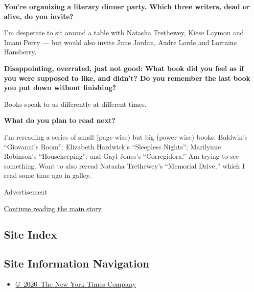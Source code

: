 \textbf{You're organizing a literary dinner party. Which three writers,
dead or alive, do you invite?}

I'm desperate to sit around a table with Natasha Trethewey, Kiese Laymon
and Imani Perry --- but would also invite June Jordan, Audre Lorde and
Lorraine Hansberry.

\textbf{Disappointing, overrated, just not good: What book did you feel
as if you were supposed to like, and didn't? Do you remember the last
book you put down without finishing?}

Books speak to us differently at different times.

\textbf{What do you plan to read next?}

I'm rereading a series of small (page-wise) but big (power-wise) books:
Baldwin's ``Giovanni's Room''; Elizabeth Hardwick's ``Sleepless
Nights''; Marilynne Robinson's ``Housekeeping''; and Gayl Jones's
``Corregidora.'' Am trying to see something. Want to also reread Natasha
Trethewey's ``Memorial Drive,'' which I read some time ago in galley.

Advertisement

\protect\hyperlink{after-bottom}{Continue reading the main story}

\hypertarget{site-index}{%
\subsection{Site Index}\label{site-index}}

\hypertarget{site-information-navigation}{%
\subsection{Site Information
Navigation}\label{site-information-navigation}}

\begin{itemize}
\tightlist
\item
  \href{https://help.nytimes3xbfgragh.onion/hc/en-us/articles/115014792127-Copyright-notice}{©~2020~The
  New York Times Company}
\end{itemize}

